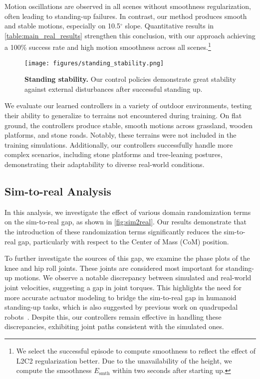  Motion oscillations are observed in all scenes without smoothness regularization, often leading to standing-up failures. In contrast, our method produces smooth and stable motions, especially on 10.5$^\circ$ slope. Quantitative results in \cref{table:main_real_results} strengthen this conclusion, with our approach achieving a 100\% success rate and high motion smoothness across all scenes.\footnote{We select the successful episode to compute smoothness to reflect the effect of L2C2 regularization better. Due to the unavailability of the height, we compute the smoothness $E_{\mathrm{smth}}$ within two seconds after starting up. }

\begin{figure}[t]
    \centering
    \texttt{[image: figures/standing\_stability.png]}
    \caption{\textbf{Standing stability.} Our control policies demonstrate great stability against external disturbances after successful standing up.}
    \vspace{-0.1in}
    \label{fig:standing_stability}
\end{figure}

 We evaluate our learned controllers in a variety of outdoor environments, testing their ability to generalize to terrains not encountered during training. On flat ground, the controllers produce stable, smooth motions across grassland, wooden platforms, and stone roads. Notably, these terrains were not included in the training simulations. Additionally, our controllers successfully handle more complex scenarios, including stone platforms and tree-leaning postures, demonstrating their adaptability to diverse real-world conditions.


\subsection{Sim-to-real Analysis}
In this analysis, we investigate the effect of various domain randomization terms on the sim-to-real gap, as shown in \cref{fig:sim2real}. Our results demonstrate that the introduction of these randomization terms significantly reduces the sim-to-real gap, particularly with respect to the Center of Mass (CoM) position.

 To further investigate the sources of this gap, we examine the phase plots of the knee and hip roll joints. These joints are considered most important for standing-up motions. We observe a notable discrepancy between simulated and real-world joint velocities, suggesting a gap in joint torques. This highlights the need for more accurate actuator modeling to bridge the sim-to-real gap in humanoid standing-up tasks, which is also suggested by previous work on quadrupedal robots~\cite{hwangbo2019learning}. Despite this, our controllers remain effective in handling these discrepancies, exhibiting joint paths consistent with the simulated ones.


